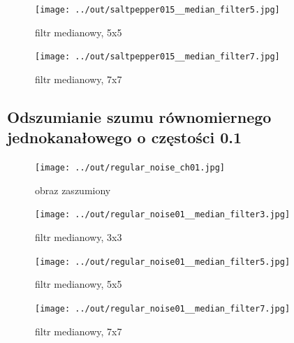 \documentclass[a4paper,12pt]{article}
\begin{document}
\begin{figure}[h!]
\begin{minipage}[t]{7.5cm}
\begin{center}
\texttt{[image: ../out/saltpepper015\_\_median\_filter5.jpg]}
\caption{filtr medianowy, 5x5}
\end{center}
\end{minipage}
\hfill
\begin{minipage}[t]{7.5cm}
\begin{center}
\texttt{[image: ../out/saltpepper015\_\_median\_filter7.jpg]}
\caption{filtr medianowy, 7x7}
\end{center}
\end{minipage}
\end{figure}


\newpage
\subsection{Odszumianie szumu równomiernego jednokanałowego o częstości 0.1}
\begin{figure}[h!]
\begin{minipage}[t]{7.5cm}
\begin{center}
\texttt{[image: ../out/regular\_noise\_ch01.jpg]}
\caption{obraz zaszumiony}
\end{center}
\end{minipage}
\hfill
\begin{minipage}[t]{7.5cm}
\begin{center}
\texttt{[image: ../out/regular\_noise01\_\_median\_filter3.jpg]}
\caption{filtr medianowy, 3x3}
\end{center}
\end{minipage}
\end{figure}

\begin{figure}[h!]
\begin{minipage}[t]{7.5cm}
\begin{center}
\texttt{[image: ../out/regular\_noise01\_\_median\_filter5.jpg]}
\caption{filtr medianowy, 5x5}
\end{center}
\end{minipage}
\hfill
\begin{minipage}[t]{7.5cm}
\begin{center}
\texttt{[image: ../out/regular\_noise01\_\_median\_filter7.jpg]}
\caption{filtr medianowy, 7x7}
\end{center}
\end{minipage}
\end{figure}
\end{document}

